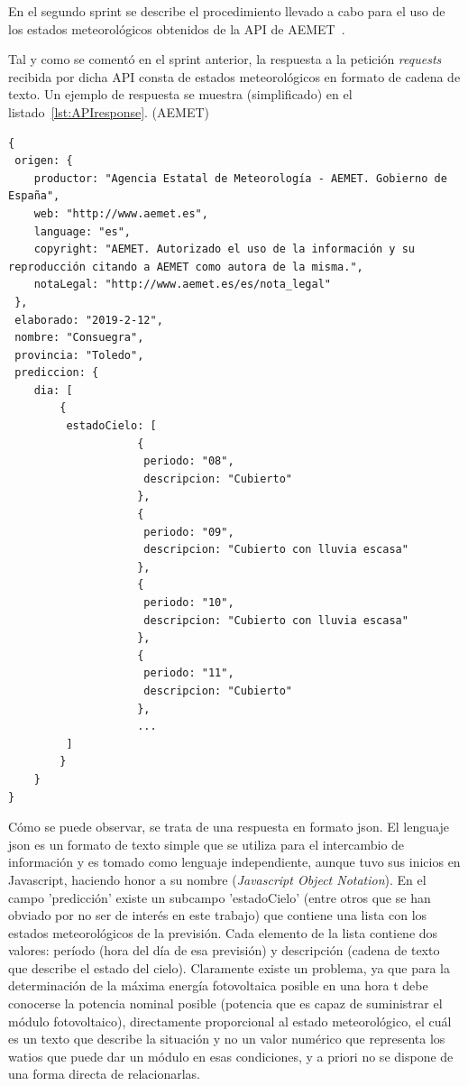 En el segundo sprint se describe el procedimiento llevado a cabo para el uso de los estados meteorológicos obtenidos de la API de AEMET~\cite{Aemet}.

Tal y como se comentó en el sprint anterior, la respuesta a la petición \textit{requests} recibida por dicha API consta de estados meteorológicos en formato de cadena de texto. Un ejemplo de respuesta se muestra (simplificado) en el listado~\ref{lst:APIresponse}. (\textcopyright AEMET)

\begin{lstlisting}[numbers=none,caption={Ejemplo de respuesta de la API - AEMET},label={lst:APIresponse}]
{
 origen: {
	productor: "Agencia Estatal de Meteorología - AEMET. Gobierno de España",
	web: "http://www.aemet.es",
	language: "es",
	copyright: "AEMET. Autorizado el uso de la información y su reproducción citando a AEMET como autora de la misma.",
	notaLegal: "http://www.aemet.es/es/nota_legal"
 },
 elaborado: "2019-2-12",
 nombre: "Consuegra",
 provincia: "Toledo",
 prediccion: {
 	dia: [
		{
		 estadoCielo: [
					{
					 periodo: "08",
					 descripcion: "Cubierto"
					},
					{
					 periodo: "09",
					 descripcion: "Cubierto con lluvia escasa"
					},
					{
					 periodo: "10",
					 descripcion: "Cubierto con lluvia escasa"
					},
					{
					 periodo: "11",
					 descripcion: "Cubierto"
					},
					...
		 ]
		}
	}
}
\end{lstlisting}

Cómo se puede observar, se trata de una respuesta en formato json. El lenguaje json es un formato de texto simple que se utiliza para el intercambio de información y es tomado como lenguaje independiente, aunque tuvo sus inicios en Javascript, haciendo honor a su nombre (\textit{Javascript Object Notation}). En el campo 'predicción' existe un subcampo 'estadoCielo' (entre otros que se han obviado por no ser de interés en este trabajo) que contiene una lista con los estados meteorológicos de la previsión. Cada elemento de la lista contiene dos valores: período (hora del día de esa previsión) y descripción (cadena de texto que describe el estado del cielo). Claramente existe un problema, ya que para la determinación de la máxima energía fotovoltaica posible en una hora t debe conocerse la potencia nominal posible (potencia que es capaz de suministrar el módulo fotovoltaico), directamente proporcional al estado meteorológico, el cuál es un texto que describe la situación y no un valor numérico que representa los watios que puede dar un módulo en esas condiciones, y a priori no se dispone de una forma directa de relacionarlas. \\

